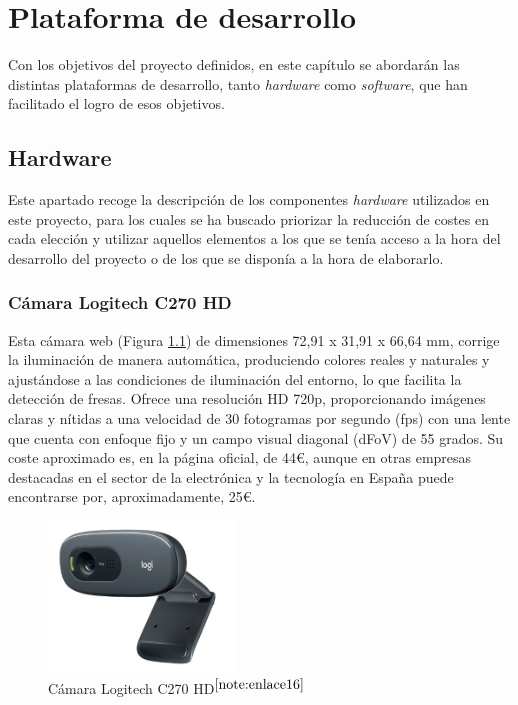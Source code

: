 \chapter{Plataforma de desarrollo}
\label{cap:capitulo4}
 
Con los objetivos del proyecto definidos, en este capítulo se abordarán las distintas plataformas de desarrollo, tanto \textit{hardware} como \textit{software}, que han facilitado el logro de esos objetivos.

\section{Hardware}
\label{sec:hardware}

Este apartado recoge la descripción de los componentes \textit{hardware} utilizados en este proyecto, para los cuales se ha buscado priorizar la reducción de costes en cada elección y utilizar aquellos elementos a los que se tenía acceso a la hora del desarrollo del proyecto o de los que se disponía a la hora de elaborarlo.

\subsection{Cámara Logitech C270 HD}
\label{subsec:logiC270HD}

Esta cámara web (Figura \ref{fig:logiC270HD}) de dimensiones 72,91 x 31,91 x 66,64 mm, corrige la iluminación de manera automática, produciendo colores reales y naturales y ajustándose a las condiciones de iluminación del entorno, lo que facilita la detección de fresas. Ofrece una resolución HD 720p, proporcionando imágenes claras y nítidas a una velocidad de 30 fotogramas por segundo (fps) con una lente que cuenta con enfoque fijo y un campo visual diagonal (dFoV) de 55 grados. Su coste aproximado es, en la página oficial, de 44€, aunque en otras empresas destacadas en el sector de la electrónica y la tecnología en España puede encontrarse por, aproximadamente, 25€.

\begin{figure} [H]
    \begin{center}
      \includegraphics[width=5cm]{figs/logi C270.png}
    \end{center}
    \caption{Cámara Logitech C270 HD$^{\ref{note:enlace16}}$}
    \label{fig:logiC270HD}
\end{figure}

